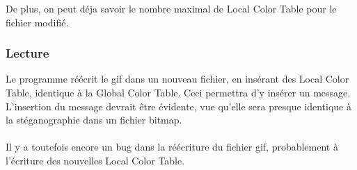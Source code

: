 De plus, on peut déja savoir le nombre maximal de Local Color Table pour le fichier modifié.

\subsubsection{Lecture}
Le programme réécrit le gif dans un nouveau fichier, en insérant des Local Color Table, identique à la Global Color Table. 
Ceci permettra d'y insérer un message. 
L'insertion du message devrait être évidente, vue qu'elle sera presque identique à la stéganographie dans un fichier bitmap.\\\\

Il y a toutefois encore un bug dans la réécriture du fichier gif, probablement à l'écriture des nouvelles Local Color Table.